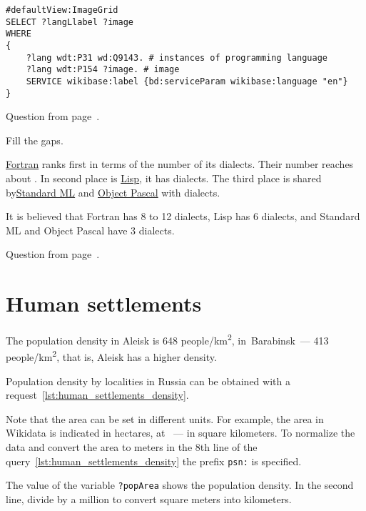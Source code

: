 \begin{lstlisting}[language=SPARQL, 
    caption={Programmers languages logos. SPARQL query: \href{https://w.wiki/kfd}{https://w.wiki/kfd}}, 
    label=lst:prog_lang_answer_1
                ]
#defaultView:ImageGrid
SELECT ?langLlabel ?image
WHERE
{
	?lang wdt:P31 wd:Q9143. # instances of programming language
	?lang wdt:P154 ?image. # image
	SERVICE wikibase:label {bd:serviceParam wikibase:language "en"}
}
\end{lstlisting}

Question from page~\pageref{question:prog_lang_2}.


\begin{exercise}
    \label{answer:prog_lang_3}
Fill the gaps.

\href{https://www.wikidata.org/wiki/Q83303}{Fortran} ranks first in terms of the number of its dialects. Their number reaches about \underline{\hspace{1cm}}. In second place is \href{https://www.wikidata.org/wiki/Q132874}{Lisp}, it has \underline{\hspace{1cm}} dialects. The third place is shared by\href{https://www.wikidata.org/wiki/Q597330}{Standard ML} and \href{https://www.wikidata.org/wiki/Q633894}{Object Pascal} with \underline{\hspace{1cm}} dialects.
\end{exercise}
 It is believed that Fortran has 8 to 12 dialects, Lisp has 6 dialects, and Standard ML and Object Pascal have 3 dialects.
    
Question from page~\pageref{question:prog_lang_3}.


\section{Human settlements}

\begin{exercise}
\label{answer:human_settlements_density}

The population density in Aleisk is \num{648} people/km\textsuperscript{2},
in~Barabinsk~--- \num{413} people/km\textsuperscript{2},
that is, Aleisk has a higher density. 

        Population density by localities in Russia can be obtained 
                with a request~\ref{lst:human_settlements_density}. 

        Note that the area can be set in different units. 
        For example,  the area in Wikidata is indicated in hectares,
at ~--- in square kilometers. 
                To normalize the data and convert the area to meters in the 8th line of the query~\ref{lst:human_settlements_density}
        the prefix \lstinline|psn:| is specified. 

        The value of the variable \lstinline|?popArea| shows the population density. 
        In the second line, divide by a million to convert square meters into kilometers.

\end{exercise}

